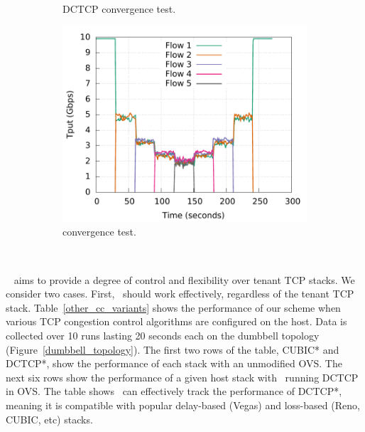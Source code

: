 \begin{figure}[!t]
\begin{subfigure}[b]{0.45\textwidth}
                \caption{DCTCP convergence test.}
                \label{dctcp_convergence}
        \end{subfigure}
        \begin{subfigure}[b]{0.45\textwidth}
                \centering
                \includegraphics[width=\textwidth]{acdctcp/figures/convergence/flowcontrolOFF/ovsdctcp_flowcontrolOFF_convergence.pdf}
                \caption{\acdc{} convergence test.}
                \label{ovsdctcp_convergence}
        \end{subfigure}
        \caption{~}
        \label{convergence_test}
\end{figure}


~\acdc{} aims to provide a degree of control and flexibility over tenant TCP stacks. 
We consider two cases.
First,~\acdc{} should work effectively, regardless of the tenant TCP stack.
Table~\ref{other_cc_variants} shows the performance of our scheme when various TCP congestion control algorithms
are configured on the host. Data is collected over 10 runs lasting 20 seconds each on the dumbbell topology (Figure~\ref{dumbbell_topology}). 
The first two rows of the table, CUBIC* and DCTCP*, show the performance of each stack with an 
unmodified OVS. The next six rows show the performance of a given host stack with~\acdc{} running DCTCP in OVS.
The table shows~\acdc{} can effectively track the performance of DCTCP*, meaning 
it is compatible with popular delay-based (Vegas) and loss-based (Reno, CUBIC, etc) stacks.

